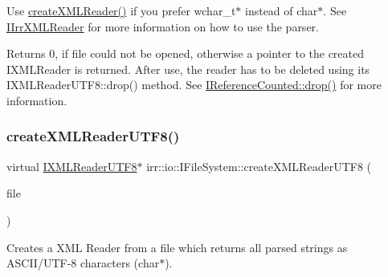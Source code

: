 Use \hyperlink{classirr_1_1io_1_1IFileSystem_a167c9fa159d16ee5c56c074636b0865e}{create\+X\+M\+L\+Reader()} if you prefer wchar\+\_\+t$\ast$ instead of char$\ast$. See \hyperlink{classirr_1_1io_1_1IIrrXMLReader}{I\+Irr\+X\+M\+L\+Reader} for more information on how to use the parser. \begin{DoxyReturn}{Returns}
0, if file could not be opened, otherwise a pointer to the created I\+X\+M\+L\+Reader is returned. After use, the reader has to be deleted using its I\+X\+M\+L\+Reader\+U\+T\+F8\+::drop() method. See \hyperlink{classirr_1_1IReferenceCounted_a03856a09355b89d178090c4a5f738543}{I\+Reference\+Counted\+::drop()} for more information. 
\end{DoxyReturn}
\mbox{\label{classirr_1_1io_1_1IFileSystem_acda42a761d3b2fb4d39ad1d9e2ada973}} 
\subsubsection{\texorpdfstring{create\+X\+M\+L\+Reader\+U\+T\+F8()}{createXMLReaderUTF8()}\hspace{0.1cm}{\footnotesize\ttfamily [2/2]}}
{\footnotesize\ttfamily virtual \hyperlink{namespaceirr_1_1io_a2dedc8156931082e6b147b562195e310}{I\+X\+M\+L\+Reader\+U\+T\+F8}$\ast$ irr\+::io\+::\+I\+File\+System\+::create\+X\+M\+L\+Reader\+U\+T\+F8 (\begin{DoxyParamCaption}\item[{\hyperlink{classirr_1_1io_1_1IReadFile}{I\+Read\+File} $\ast$}]{file }\end{DoxyParamCaption})\hspace{0.3cm}{\ttfamily [pure virtual]}}



Creates a X\+ML Reader from a file which returns all parsed strings as A\+S\+C\+I\+I/\+U\+T\+F-\/8 characters (char$\ast$). 

